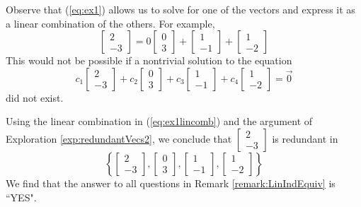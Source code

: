 \documentclass{ximera}
\begin{document}
\begin{example}
\begin{explanation}
 Observe that (\ref{eq:ex1})  allows us to solve for one of the vectors and express it as a linear combination of the others. For example, 
\begin{equation}\label{eq:ex1lincomb}
    \begin{bmatrix}2\\-3\end{bmatrix}=0 \begin{bmatrix}0\\3\end{bmatrix}+\begin{bmatrix}1\\-1\end{bmatrix}+\begin{bmatrix}1\\-2\end{bmatrix}
\end{equation}
This would not be possible if a nontrivial solution to the equation
$$c_1\begin{bmatrix}2\\-3\end{bmatrix}+c_2 \begin{bmatrix}0\\3\end{bmatrix}+c_3\begin{bmatrix}1\\-1\end{bmatrix}+c_4\begin{bmatrix}1\\-2\end{bmatrix}=\vec{0}$$
did not exist.

Using the linear combination in (\ref{eq:ex1lincomb}) and the argument of Exploration \ref{exp:redundantVecs2}, we conclude that $\begin{bmatrix}2\\-3\end{bmatrix}$ is redundant in 
$$\left\{\begin{bmatrix}2\\-3\end{bmatrix}, \begin{bmatrix}0\\3\end{bmatrix},\begin{bmatrix}1\\-1\end{bmatrix},\begin{bmatrix}1\\-2\end{bmatrix}\right\}$$
We find that the answer to all questions in Remark \ref{remark:LinIndEquiv} is ``YES".
 

\end{explanation}
\end{example}
\end{document}
